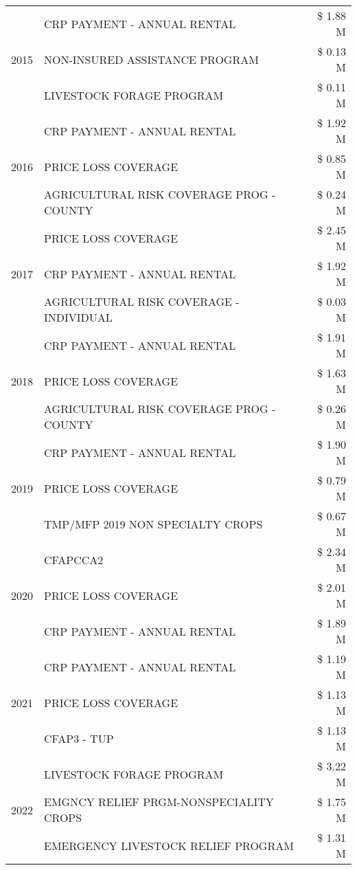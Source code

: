 \begin{tabular}{llr}
\cline{1-3}
\multirow[t]{3}{*}{2015} & CRP PAYMENT - ANNUAL RENTAL & \$ 1.88 M \\
 & NON-INSURED ASSISTANCE PROGRAM & \$ 0.13 M \\
 & LIVESTOCK FORAGE PROGRAM & \$ 0.11 M \\
\cline{1-3}
\multirow[t]{3}{*}{2016} & CRP PAYMENT - ANNUAL RENTAL & \$ 1.92 M \\
 & PRICE LOSS COVERAGE & \$ 0.85 M \\
 & AGRICULTURAL RISK COVERAGE PROG - COUNTY & \$ 0.24 M \\
\cline{1-3}
\multirow[t]{3}{*}{2017} & PRICE LOSS COVERAGE & \$ 2.45 M \\
 & CRP PAYMENT - ANNUAL RENTAL & \$ 1.92 M \\
 & AGRICULTURAL RISK COVERAGE - INDIVIDUAL & \$ 0.03 M \\
\cline{1-3}
\multirow[t]{3}{*}{2018} & CRP PAYMENT - ANNUAL RENTAL & \$ 1.91 M \\
 & PRICE LOSS COVERAGE & \$ 1.63 M \\
 & AGRICULTURAL RISK COVERAGE PROG - COUNTY & \$ 0.26 M \\
\cline{1-3}
\multirow[t]{3}{*}{2019} & CRP PAYMENT - ANNUAL RENTAL & \$ 1.90 M \\
 & PRICE LOSS COVERAGE & \$ 0.79 M \\
 & TMP/MFP 2019 NON SPECIALTY CROPS & \$ 0.67 M \\
\cline{1-3}
\multirow[t]{3}{*}{2020} & CFAPCCA2 & \$ 2.34 M \\
 & PRICE LOSS COVERAGE & \$ 2.01 M \\
 & CRP PAYMENT - ANNUAL RENTAL & \$ 1.89 M \\
\cline{1-3}
\multirow[t]{3}{*}{2021} & CRP PAYMENT - ANNUAL RENTAL & \$ 1.19 M \\
 & PRICE LOSS COVERAGE & \$ 1.13 M \\
 & CFAP3 - TUP & \$ 1.13 M \\
\cline{1-3}
\multirow[t]{3}{*}{2022} & LIVESTOCK FORAGE PROGRAM & \$ 3.22 M \\
 & EMGNCY RELIEF PRGM-NONSPECIALITY CROPS & \$ 1.75 M \\
 & EMERGENCY LIVESTOCK RELIEF PROGRAM & \$ 1.31 M \\
\cline{1-3}
\bottomrule
\end{tabular}
